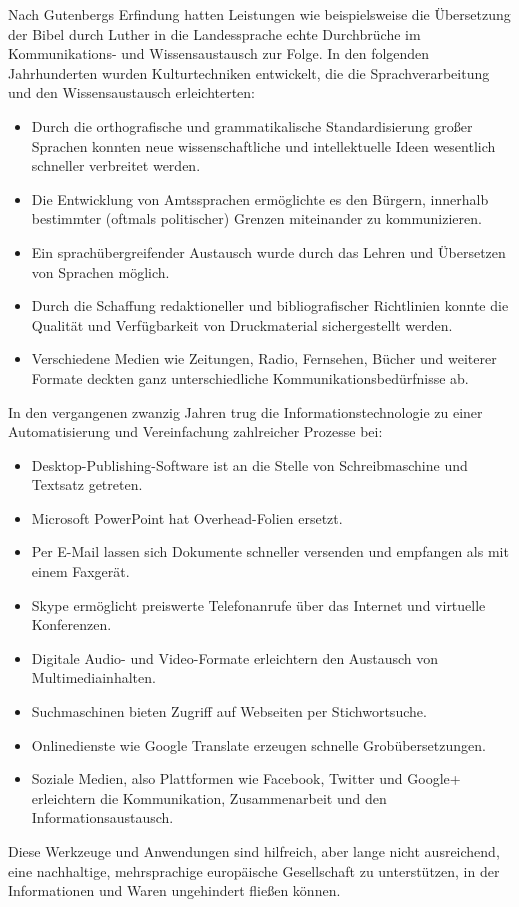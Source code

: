 \documentclass[]{../../metanetpaper}
\begin{document}
\begin{Parallel}[c]{79mm}{78mm}
{Nach Gutenbergs Erfindung hatten Leistungen wie beispielsweise die Übersetzung der Bibel durch Luther in die Landessprache echte Durchbrüche im Kom\-mu\-ni\-ka\-tions- und Wis\-sens\-aus\-tausch zur Folge. In den folgenden Jahrhunderten wurden Kulturtechniken entwickelt, die die Sprachverarbeitung und den Wissensaustausch erleichterten:
    \begin{itemize}
      \item Durch die orthografische und grammatikalische Standardisierung großer Sprachen konnten neue wissenschaftliche und intellektuelle Ideen wesentlich schneller verbreitet werden.
      \item Die Entwicklung von Amtssprachen ermöglichte es den Bürgern, innerhalb bestimmter (oftmals politischer) Grenzen miteinander zu kommunizieren.
      \item Ein sprachübergreifender Austausch wurde durch das Lehren und Übersetzen von Sprachen möglich.
      \item Durch die Schaffung redaktioneller und bibliografischer Richtlinien konnte die Qualität und Verfügbarkeit von Druckmaterial sichergestellt werden.
      \item Verschiedene Medien wie Zeitungen, Radio, Fernsehen, Bücher und weiterer Formate deckten ganz unterschiedliche Kommunikationsbedürfnisse ab.
    \end{itemize}
In den vergangenen zwanzig Jahren trug die Informationstechnologie zu einer Automatisierung und Vereinfachung zahlreicher Prozesse bei:
    \begin{itemize}
      \item Desktop-Publishing-Software ist an die Stelle von Schreibmaschine und Textsatz getreten.
      \item Microsoft PowerPoint hat Overhead-Folien ersetzt.
      \item Per E-Mail lassen sich Dokumente schneller versenden und empfangen als mit einem Faxgerät.
      \item Skype ermöglicht preiswerte Telefonanrufe über das Internet und virtuelle Konferenzen.
      \item Digitale Audio- und Video-Formate erleichtern den Austausch von Multimediainhalten.
      \item Suchmaschinen bieten Zugriff auf Webseiten per Stichwortsuche.
      \item Onlinedienste wie Google Translate erzeugen schnelle Grobübersetzungen.
      \item Soziale Medien, also Plattformen wie Facebook, Twitter und Google+ erleichtern die Kommunikation, Zusammenarbeit und den Informationsaustausch.
    \end{itemize}
Diese Werkzeuge und Anwendungen sind hilfreich, aber lange nicht ausreichend, eine nachhaltige, mehrsprachige europäische Gesellschaft zu unterstützen, in der Informationen und Waren ungehindert fließen können.
  }


\end{Parallel}
\end{document}
